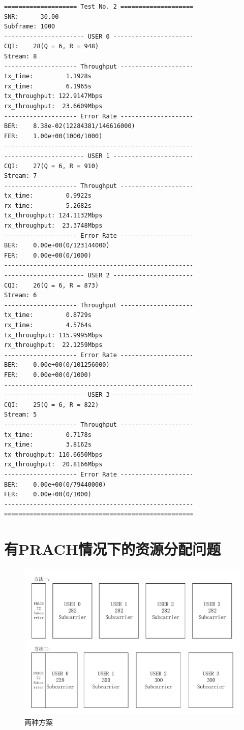 \documentclass{article}
\begin{document}
\begin{lstlisting}
==================== Test No. 2 ====================
SNR:      30.00
Subframe: 1000
---------------------- USER 0 ----------------------
CQI:    28(Q = 6, R = 948)
Stream: 8
-------------------- Throughput --------------------
tx_time:         1.1928s
rx_time:         6.1965s
tx_throughput: 122.9147Mbps
rx_throughput:  23.6609Mbps
-------------------- Error Rate --------------------
BER:    8.38e-02(12284381/146616000)
FER:    1.00e+00(1000/1000)
----------------------------------------------------
---------------------- USER 1 ----------------------
CQI:    27(Q = 6, R = 910)
Stream: 7
-------------------- Throughput --------------------
tx_time:         0.9922s
rx_time:         5.2682s
tx_throughput: 124.1132Mbps
rx_throughput:  23.3748Mbps
-------------------- Error Rate --------------------
BER:    0.00e+00(0/123144000)
FER:    0.00e+00(0/1000)
----------------------------------------------------
---------------------- USER 2 ----------------------
CQI:    26(Q = 6, R = 873)
Stream: 6
-------------------- Throughput --------------------
tx_time:         0.8729s
rx_time:         4.5764s
tx_throughput: 115.9995Mbps
rx_throughput:  22.1259Mbps
-------------------- Error Rate --------------------
BER:    0.00e+00(0/101256000)
FER:    0.00e+00(0/1000)
----------------------------------------------------
---------------------- USER 3 ----------------------
CQI:    25(Q = 6, R = 822)
Stream: 5
-------------------- Throughput --------------------
tx_time:         0.7178s
rx_time:         3.8162s
tx_throughput: 110.6650Mbps
rx_throughput:  20.8166Mbps
-------------------- Error Rate --------------------
BER:    0.00e+00(0/79440000)
FER:    0.00e+00(0/1000)
----------------------------------------------------
====================================================
\end{lstlisting}

\section{有PRACH情况下的资源分配问题}
\begin{figure}[H]
	\centering
	\includegraphics[width = \textwidth]{ques.pdf}
	\caption{两种方案}
\end{figure}

\end{document}
